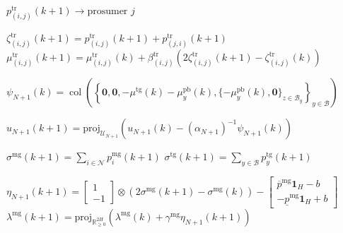 \documentclass{IEEEtran}  %
\newcommand{\mc}{\mathcal}
\newcommand{\bb}{\mathbb}
\newcommand{\R}{\bb R}
\newcommand{\proj}{\mathrm{proj}}
\newcommand{\col}{\operatorname{col}}
\newcommand{\0}{\mathbf{0}}
\newcommand{\1}{\mathbf{1}}
\begin{document}
\begin{algorithm*}[htbp]
\begin{algorithmic}[1]
\State
 $p^{\text{tr}}_{(i,j)}(k+1)
	\longrightarrow \text{prosumer }j$
	\EndFor
\EndComm


\Dual{ }
\ForAll{$ j \in \mc N_i$}
\State
$\zeta^{\text{tr}}_{(i,j)}(k+1)  =  p^{\textrm{tr}}_{(i,j)} (k+1) + p^{\textrm{tr}}_{(j,i)} (k+1)$
\State
$\mu^{\text{tr}}_{(i,j)}(k+1) = \mu^{\text{tr}}_{(i,j)}(k) + \beta_{(i,j)}^{\text{tr}} \left( 
	2  \zeta^{\text{tr}}_{(i,j)}(k+1) - \zeta^{\text{tr}}_{(i,j)}(k)
	\right)$
\EndFor

\EndDual

\EndPRO

\EndFor

\smallskip
\DNO{ }

\Primal{}
\State
$\psi_{N+1}(k) = \col \left( 
	\left\{
	\0,\0,-\mu^{\text{tg}}(k) - \mu_y^{\text{pb}}(k), 
	\{ -\mu_y^{\text{pb}}(k), \0 \}_{z \in \mc B_y}
	\right\}_{y \in \mc B}
	\right)$

\State 	$u_{N+1}(k+1) = \proj_{\mc U_{N+1}}  \left( u_{N+1}(k) - (\alpha_{N+1})^{-1} \psi_{N+1}(k) \right)$
\EndPrimal

\Agg{}
\State
$ \sigma^{\text{mg}}(k+1) = \sum_{i \in \mc N} p_i^{\text{mg}}(k+1) $
\State
$\sigma^{\text{tg}}(k+1) = \sum_{y \in \mc B} p_y^{\text{tg}}(k+1)$
\EndAgg

\Dual{}
\State
$\eta_{N+1}(k+1	) = 
	\left[
	\begin{smallmatrix}
	1\\
	- 1 
	\end{smallmatrix}
	\right] \otimes (2 \sigma^{\text{mg}}(k+1)- \sigma^{\text{mg}}(k)) 
	-
	\left[
	\begin{smallmatrix}
	\overline{p}^{\mathrm{mg}}\1_{H}-b \\
	-     \underline{p}^{\mathrm{mg}} \1_{H}+b
	\end{smallmatrix} 
	\right]  $
	\State
$\lambda^{\text{mg}}(k+1) = \textstyle
	\proj_{\R^{2 H}_{\geq 0}}\left( 
	\lambda^{\text{mg}}(k) + \gamma^{\text{mg}} \eta_{N+1}(k+1)
	 \right)$

\ForAll{buses $ y \in \mc B$}


\end{algorithmic}
\end{algorithm*}
\end{document}
